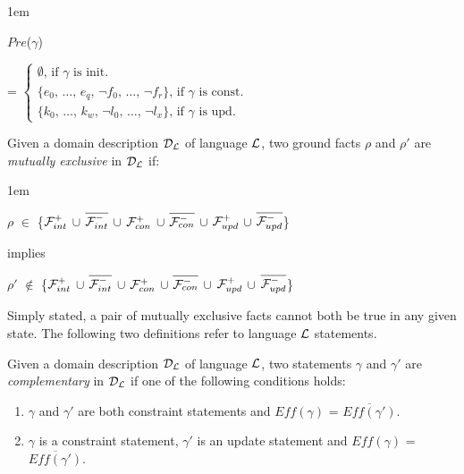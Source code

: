 \documentclass[global,twocolumn,draft]{svjour}
\newenvironment{vdefinition}
  {\begin{definition}\hspace{0.25em}}
  {\end{definition}}
\newenvironment{vquote}
  {\begin{list}{}{\leftmargin 1em}\item[]}
  {\end{list}}
\begin{document}
    \begin{vquote}
      $Pre$($\gamma$)

      =
      \begin{math}
        \begin{cases}
          \mbox{$\emptyset$, if $\gamma$ is init.} \\
          \mbox{\{$e_{0}$, \ldots, $e_{q}$, $\lnot$$f_{0}$, \ldots, $\lnot$$f_{r}$\}, if $\gamma$ is const.} \\
          \mbox{\{$k_{0}$, \ldots, $k_{w}$, $\lnot$$l_{0}$, \ldots, $\lnot$$l_{x}$\}, if $\gamma$ is upd.}
        \end{cases}
      \end{math}
    \end{vquote}

    \begin{vdefinition}
      \label{def-mutex}
      Given a domain description ${\cal D_{L}}$ of language ${\cal L}$,
      two ground facts $\rho$ and $\rho'$ are {\em mutually exclusive}
      in ${\cal D_{L}}$ if:
      \begin{vquote}
        $\rho$ $\in$ \{${\cal F}^{+}_{int}$ $\cup$
        $\overline{{\cal F}^{-}_{int}}$ $\cup$ ${\cal F}^{+}_{con}$ $\cup$
        $\overline{{\cal F}^{-}_{con}}$ $\cup$ ${\cal F}^{+}_{upd}$ $\cup$
        $\overline{{\cal F}^{-}_{upd}}$\}

        implies

        $\rho'$ $\not\in$ \{${\cal F}^{+}_{int}$ $\cup$
        $\overline{{\cal F}^{-}_{int}}$ $\cup$ ${\cal F}^{+}_{con}$ $\cup$
        $\overline{{\cal F}^{-}_{con}}$ $\cup$ ${\cal F}^{+}_{upd}$ $\cup$
        $\overline{{\cal F}^{-}_{upd}}$\}
      \end{vquote}
    \end{vdefinition}

    Simply stated, a pair of mutually exclusive facts cannot both be true
    in any given state. The following two definitions refer to language
    ${\cal L}$ statements.

    \begin{vdefinition}
      \label{def-comp}
      Given a domain description ${\cal D_{L}}$ of language ${\cal L}$,
      two statements $\gamma$ and $\gamma'$ are {\em complementary} in
      ${\cal D_{L}}$ if one of the following conditions holds:
      \begin{enumerate}
        \item
          $\gamma$ and $\gamma'$ are both constraint statements and
          $Eff(\gamma)$ = $\overline{Eff(\gamma')}$.
        \item
          $\gamma$ is a constraint statement, $\gamma'$ is an update
          statement and $Eff(\gamma)$ = $\overline{Eff(\gamma')}$.
      \end{enumerate}
    \end{vdefinition}
\end{document}
